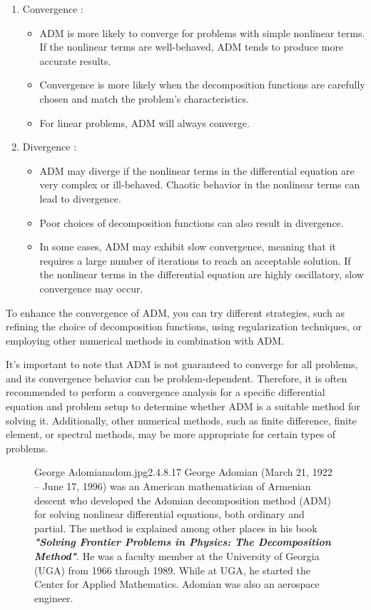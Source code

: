 \begin{enumerate}
    \item Convergence :
          \begin{itemize}
              \item ADM is more likely to converge for problems with simple nonlinear terms. If the nonlinear terms are well-behaved, ADM tends to produce more accurate results.
              \item Convergence is more likely when the decomposition functions are carefully chosen and match the problem's characteristics.
              \item For linear problems, ADM will always converge.
          \end{itemize}
    \item Divergence :
          \begin{itemize}
              \item ADM may diverge if the nonlinear terms in the differential equation are very complex or ill-behaved. Chaotic behavior in the nonlinear terms can lead to divergence.
              \item Poor choices of decomposition functions can also result in divergence.
              \item In some cases, ADM may exhibit slow convergence, meaning that it requires a large number of iterations to reach an acceptable solution. If the nonlinear terms in the differential equation are highly oscillatory, slow convergence may occur.
          \end{itemize}
\end{enumerate}
To enhance the convergence of ADM, you can try different strategies, such as refining the choice of decomposition functions, using regularization techniques, or employing other numerical methods in combination with ADM.
\par
It's important to note that ADM is not guaranteed to converge for all problems, and its convergence behavior can be problem-dependent. Therefore, it is often recommended to perform a convergence analysis for a specific differential equation and problem setup to determine whether ADM is a suitable method for solving it. Additionally, other numerical methods, such as finite difference, finite element, or spectral methods, may be more appropriate for certain types of problems.
\begin{figure}[b]
    \begin{enrichment}{George Adomian}{adom.jpg}{2.4}{.8}{.17}
        George Adomian (March 21, 1922 – June 17, 1996)
        was an American mathematician of Armenian descent
        who developed the Adomian decomposition method (ADM)
        for solving nonlinear differential equations,
        both ordinary and partial.
        The method is explained among other places
        in his book \textit{\textbf{"Solving Frontier Problems in Physics:
                The Decomposition Method"}}.
        He was a faculty member at the University of Georgia
        (UGA) from 1966 through 1989. While at UGA,
        he started the Center for Applied Mathematics.
        Adomian was also an aerospace engineer.
    \end{enrichment}
\end{figure}
\newpage

